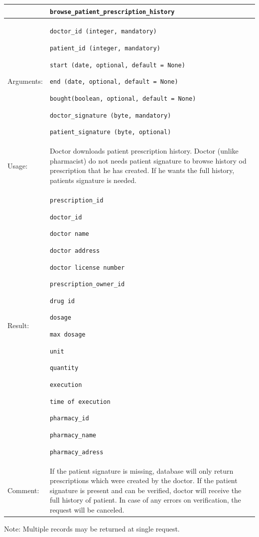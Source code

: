     \begin{longtable}{| p{3cm} | p{10.75cm} |}
    \hline
     & \texttt{browse\_patient\_prescription\_history} \\ \hline
    Arguments: &  \begin{packed_enum}
    	\item \texttt{doctor\_id (integer, mandatory)}
		\item \texttt{patient\_id (integer, mandatory)}
		\item \texttt{start (date, optional, default = None)}
		\item \texttt{end (date, optional, default = None)}
		\item \texttt{bought(boolean, optional, default = None)}
		\item \texttt{doctor\_signature (byte, mandatory)}
		\item \texttt{patient\_signature (byte, optional)}

	\end{packed_enum}     \\ \hline
    Usage: & Doctor downloads patient prescription history. Doctor (unlike pharmacist) do not needs patient signature to browse history od prescription that he has created. If he wants the full history, patients signature is needed. \\ \hline
    Result: & \begin{packed_enum}
    	\item \texttt{prescription\_id}
    	\item \texttt{doctor\_id}
    	\item \texttt{doctor name}
    	\item \texttt{doctor address}
    	\item \texttt{doctor license number}
    	\item \texttt{prescription\_owner\_id}
    	\item \texttt{drug id}
    	\item \texttt{dosage}
    	\item \texttt{max dosage}
    	\item \texttt{unit}
    	\item \texttt{quantity}
    	\item \texttt{execution}
    	\item \texttt{time of execution}
    	\item \texttt{pharmacy\_id}
    	\item \texttt{pharmacy\_name}
    	\item \texttt{pharmacy\_adress}
	\end{packed_enum}     \\ \hline
	Comment: & If the patient signature is missing, database will only return prescriptions which were created by the doctor. If the patient signature is present and can be verified, doctor will receive the full history of patient. In case of any errors on verification, the request will be canceled. \\ \hline
    \end{longtable}
Note: Multiple records may be returned at single request.

